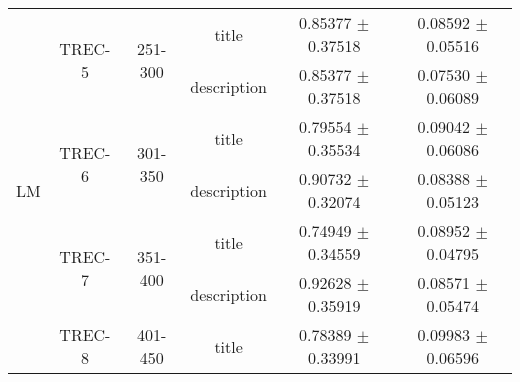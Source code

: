 \begin{table*}
\begin{tabular}{| c || c | c | c || c | c |}
    \hline
        \multirow{8}{*}{LM}
    &   \multirow{2}{*}{TREC-5}
        & \multirow{2}{*}{251-300}
            &   title %
                &   0.85377 $\pm$ 0.37518 & 0.08592 $\pm$ 0.05516\\
    &   &   &   description %
                &   0.85377 $\pm$ 0.37518 & 0.07530 $\pm$ 0.06089\\
    \cline{2-6}
    &   \multirow{2}{*}{TREC-6}
        &   \multirow{2}{*}{301-350}
            &   title %
                &   0.79554 $\pm$ 0.35534 & 0.09042 $\pm$ 0.06086\\
    &   &   &   description %
                &   0.90732 $\pm$ 0.32074 & 0.08388 $\pm$ 0.05123\\
    \cline{2-6}
    &   \multirow{2}{*}{TREC-7}
        &   \multirow{2}{*}{351-400}
            &   title %
                &   0.74949 $\pm$ 0.34559 & 0.08952 $\pm$ 0.04795\\
    &   &   &   description %
                &   0.92628 $\pm$ 0.35919 & 0.08571 $\pm$ 0.05474\\
    \cline{2-6}
    &   \multirow{2}{*}{TREC-8}
        &   \multirow{2}{*}{401-450}
            &   title %
                &   0.78389 $\pm$ 0.33991 & 0.09983 $\pm$ 0.06596\\

\end{tabular}
\end{table*}
